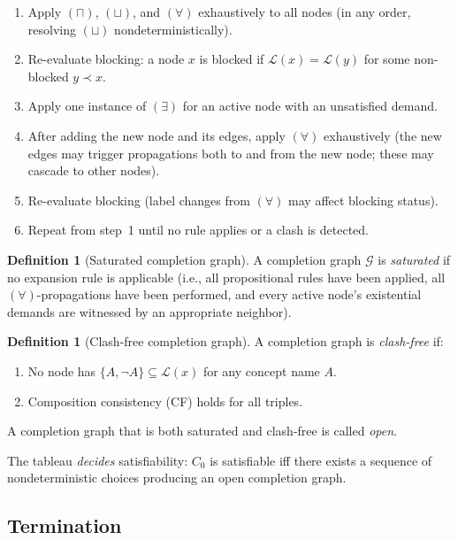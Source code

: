 \documentclass[a4paper,11pt]{article}
\theoremstyle{definition}
\newtheorem{definition}[theorem]{Definition}
\begin{document}
\begin{enumerate}[nosep]
  \item Apply $(\sqcap)$, $(\sqcup)$, and $(\forall)$ exhaustively
    to all nodes (in any order, resolving $(\sqcup)$
    nondeterministically).
  \item Re-evaluate blocking: a node $x$ is blocked if
    $\mathcal{L}(x) = \mathcal{L}(y)$ for some non-blocked $y \prec x$.
  \item Apply one instance of $(\exists)$ for an active node with an
    unsatisfied demand.
  \item After adding the new node and its edges, apply $(\forall)$
    exhaustively (the new edges may trigger propagations both to and
    from the new node; these may cascade to other nodes).
  \item Re-evaluate blocking (label changes from $(\forall)$ may
    affect blocking status).
  \item Repeat from step~1 until no rule applies or a clash is
    detected.
\end{enumerate}

\begin{definition}[Saturated completion graph]
\label{def:saturated}
A completion graph $\mathcal{G}$ is \emph{saturated} if no expansion
rule is applicable (i.e., all propositional rules have been applied,
all $(\forall)$-propagations have been performed, and every active
node's existential demands are witnessed by an appropriate neighbor).
\end{definition}

\begin{definition}[Clash-free completion graph]
\label{def:clash-free}
A completion graph is \emph{clash-free} if:
\begin{enumerate}[label=(C\arabic*),nosep]
  \item No node has $\{A, \neg A\} \subseteq \mathcal{L}(x)$ for any
    concept name $A$.
  \item Composition consistency (CF) holds for all triples.
\end{enumerate}
A completion graph that is both saturated and clash-free is called
\emph{open}.
\end{definition}

\noindent
The tableau \emph{decides} satisfiability: $C_0$ is satisfiable iff
there exists a sequence of nondeterministic choices producing an open
completion graph.

\subsection{Termination}
\label{sec:tab-termination}
\end{document}
